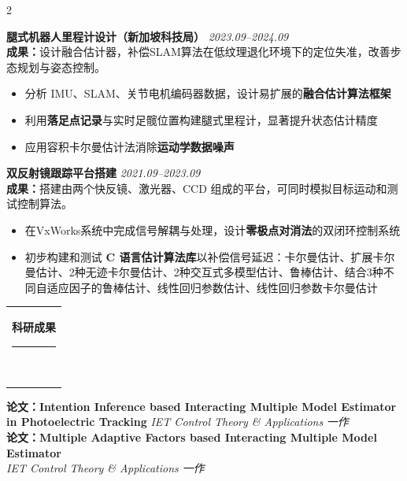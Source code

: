 \documentclass[10pt,A4]{article}
\newcommand{\mpwidth}{\linewidth-\fboxsep-\fboxsep}
\newcommand{\cvtext}[1] {
	\begin{tabular*}{1\mpwidth}{p{0.98\mpwidth}}
		\parbox{1\mpwidth}{#1}
	\end{tabular*}
}
\newcommand{\cvsection}[1] {
	\vspace{14pt}
	\cvtext{
		\textbf{\LARGE{\textcolor{darkcol}{\uppercase{#1}}}}\\[-4pt]
		\textcolor{maincol}{ \rule{0.1\textwidth}{2pt} } \\
	}
}
\begin{document}
\begin{paracol}{2}
\begin{rightcolumn}
\vspace{1.5em}

\noindent
\large\textbf{腿式机器人里程计设计（新加坡科技局）} \normalsize \hfill \textit{2023.09--2024.09}\\[4pt]
\textbf{成果：}设计融合估计器，补偿SLAM算法在低纹理退化环境下的定位失准，改善步态规划与姿态控制。\\[-4pt]
\begin{itemize}
    \item 分析 IMU、SLAM、关节电机编码器数据，设计易扩展的\textbf{融合估计算法框架}
    \item 利用\textbf{落足点记录}与实时足髋位置构建腿式里程计，显著提升状态估计精度
    \item 应用容积卡尔曼估计法消除\textbf{运动学数据噪声}
\end{itemize}

\vspace{1.5em}

\noindent
\large\textbf{双反射镜跟踪平台搭建} \normalsize \hfill \textit{2021.09--2023.09}\\[4pt]
\textbf{成果：}搭建由两个快反镜、激光器、CCD 组成的平台，可同时模拟目标运动和测试控制算法。\\[-4pt]
\begin{itemize}
    \item 在VxWorks系统中完成信号解耦与处理，设计\textbf{零极点对消法}的双闭环控制系统
    \item 初步构建和测试 \textbf{C 语言估计算法库}以补偿信号延迟：卡尔曼估计、扩展卡尔曼估计、2种无迹卡尔曼估计、2种交互式多模型估计、鲁棒估计、结合3种不同自适应因子的鲁棒估计、线性回归参数估计、线性回归参数卡尔曼估计
\end{itemize}

\vspace{1.5em}


\cvsection{科研成果}

\noindent
\normalsize\textbf{论文：Intention Inference based Interacting Multiple Model Estimator in Photoelectric Tracking} 
\small \hfill \textit{IET Control Theory \& Applications} \textit{一作} \\


\noindent
\normalsize\textbf{论文：Multiple Adaptive Factors based Interacting Multiple Model Estimator}\\
\small \phantom{IET Control Theory \& Applications} \hfill \textit{IET Control Theory \& Applications} \textit{一作} \\


\end{rightcolumn}
\end{paracol}
\end{document}
